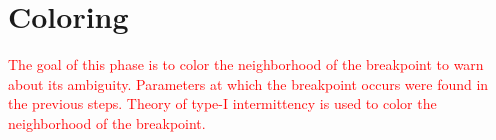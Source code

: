 


\section{Coloring}
\textcolor{red}{
The goal of this phase is to color the neighborhood of the breakpoint to warn about its ambiguity.
Parameters at which the breakpoint occurs were found in the previous steps.
Theory of type-I intermittency is used to color the neighborhood of the breakpoint.
}

